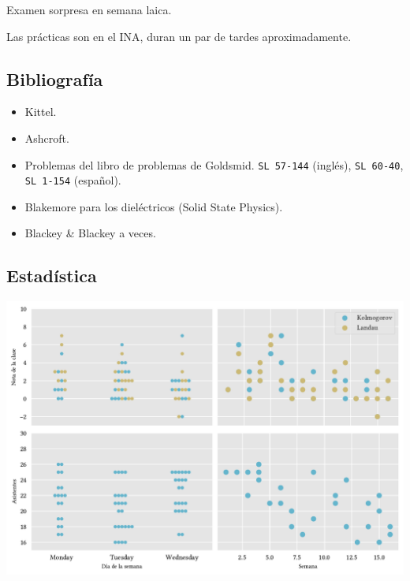 \documentclass{tufte-book}
\begin{document}
Examen sorpresa en semana laica.

Las prácticas son en el INA, duran un par de tardes aproximadamente.

\subsection{Bibliografía}
\begin{itemize}
    \item Kittel.
    \item Ashcroft.
    \item Problemas del libro de problemas de Goldsmid.
      \verb|SL 57-144| (inglés), \verb|SL 60-40|, \verb|SL 1-154|
      (español).
    \item Blakemore para los dieléctricos (Solid State Physics).
    \item Blackey \& Blackey a veces.
\end{itemize}


\subsection{Estadística}
\begin{center}
  \includegraphics[width=\textwidth]{figures/metaplot.pdf}
\end{center}
\end{document}
